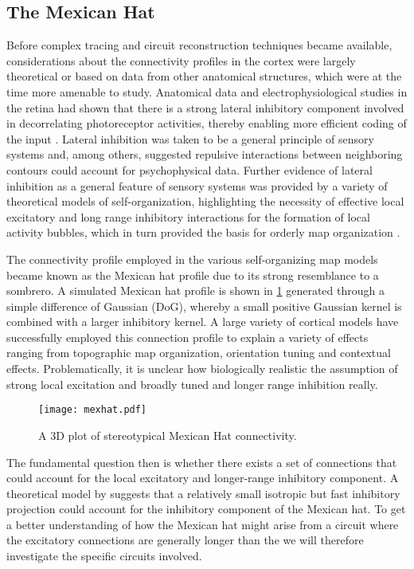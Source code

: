 \subsection{The Mexican Hat} \label{MexicanHat}

Before complex tracing and circuit reconstruction techniques became
available, considerations about the connectivity profiles in the
cortex were largely theoretical or based on data from other anatomical
structures, which were at the time more amenable to study. Anatomical
data and electrophysiological studies in the retina had shown that
there is a strong lateral inhibitory component involved in
decorrelating photoreceptor activities, thereby enabling more
efficient coding of the input \citep{Atick1992}. Lateral inhibition
was taken to be a general principle of sensory systems and, among
others, \cite{Blakemore1970} suggested repulsive interactions between
neighboring contours could account for psychophysical data. Further
evidence of lateral inhibition as a general feature of sensory systems
was provided by a variety of theoretical models of self-organization,
highlighting the necessity of effective local excitatory and long
range inhibitory interactions for the formation of local activity
bubbles, which in turn provided the basis for orderly map organization
\citep{VonderMalsburg1973,Miller1989}.

The connectivity profile employed in the various self-organizing map
models became known as the Mexican hat profile due to its strong
resemblance to a sombrero. A simulated Mexican hat profile is shown in
\ref{MexHat} generated through a simple difference of Gaussian (DoG),
whereby a small positive Gaussian kernel is combined with a larger
inhibitory kernel. A large variety of cortical models have
successfully employed this connection profile to explain a variety of
effects ranging from topographic map organization, orientation tuning
and contextual effects. Problematically, it is unclear how
biologically realistic the assumption of strong local excitation and
broadly tuned and longer range inhibition really.

\begin{figure}
	\centering \texttt{[image: mexhat.pdf]}
	\caption{A 3D plot of stereotypical Mexican Hat connectivity.}
	\label{MexHat}
\end{figure}

The fundamental question then is whether there exists a set of
connections that could account for the local excitatory and
longer-range inhibitory component. A theoretical model by
\cite{Kang2003} suggests that a relatively small isotropic but fast
inhibitory projection could account for the inhibitory component of
the Mexican hat. To get a better understanding of how the Mexican hat
might arise from a circuit where the excitatory connections are
generally longer than the we will therefore investigate the specific
circuits involved.

